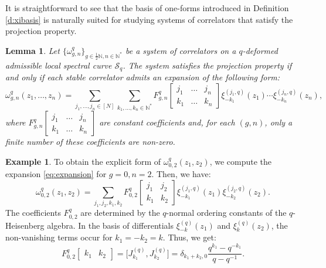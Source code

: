 \documentclass[reqno,11pt]{amsart}
\theoremstyle{plain}
\newtheorem{lemma}[theorem]{Lemma}
\theoremstyle{definition}
\newtheorem{example}[theorem]{Example}
\theoremstyle{remark}
\numberwithin{equation}{section}
\newcommand{\mb}[1]{\mathbb{#1}}
\newcommand{\1}{\mathds{1}}
\newcommand{\N}{\mb{N}}
\newcommand{\2}{\frac{1}{2}}
\begin{document}
{				It is straightforward to see that the basis of one-forms introduced in Definition \ref{d:xibasis} is naturally suited for studying systems of correlators that satisfy the projection property.
				\begin{lemma}\label{l:finiteness}
					Let $\{ \omega^{q}_{g,n} \}_{g \in \frac{1}{2} \N, n\in \N^*}$ be a system of correlators on a $q$-deformed admissible local  spectral curve $\mathcal{S}_q$. The system satisfies the projection property if and only if each stable correlator admits an expansion of the following form:
					\begin{equation}\label{eq:expansion}
						\omega^{q}_{g,n}(z_1,\ldots,z_n) = \sum_{j_1, \ldots, j_n \in [N]} \sum_{k_1, \ldots, k_n \in \mathbb{N}^*} F^{q}_{g,n} \begin{bmatrix} j_1 & \ldots & j_n \\ k_1 & \ldots & k_n \end{bmatrix} \xi_{-k_1}^{(j_1,q)}(z_1) \cdots  \xi_{-k_n}^{(j_n,q)}(z_n),
					\end{equation}
					where $F^{q}_{g,n}\begin{bmatrix} j_1 & \ldots & j_n \\ k_1 & \ldots & k_n \end{bmatrix}$ are constant coefficients and, for each $(g,n)$, only a finite number of these coefficients are non-zero.
				\end{lemma}
				\begin{example}
					{To obtain the explicit form of $\omega^q_{0,2}(z_1, z_2)$, we compute the expansion \eqref{eq:expansion} for $g=0, n=2$. Then, we have:
						\begin{equation}\label{w2}
							\omega^{q}_{0,2}(z_1, z_2) = \sum_{j_1, j_2, k_1, k_2} F^{q}_{0,2} \begin{bmatrix} j_1 & j_2 \\ k_1 & k_2 \end{bmatrix} \xi_{-k_1}^{(j_1,q)}(z_1) \xi_{-k_2}^{(j_2,q)}(z_2).
						\end{equation}
						The coefficients $F^q_{0,2}$ are determined by the $q$-normal ordering constants of the $q$-Heisenberg algebra. In the basis of differentials $\xi_{-k}^{(q)}(z_1)$ and $\xi_{k}^{(q)}(z_2)$, the non-vanishing terms occur for $k_1 = -k_2 = k$. Thus, we get:
						\begin{equation}
							F^{q}_{0,2} \begin{bmatrix} k_1 & k_2 \end{bmatrix} = \big[J^{(q)}_{k_1}, J^{(q)}_{k_2}\big] = \delta_{k_1+k_2, 0} \frac{q^{k_1} - q^{-k_1}}{q - q^{-1}}.

\end{equation}}
\end{example}}
\end{document}
